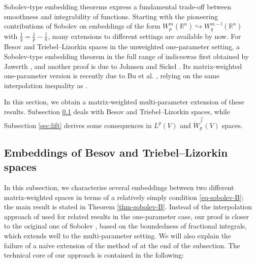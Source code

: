 \documentclass[11pt, reqno]{amsart}
\theoremstyle{definition}
\theoremstyle{remark}
\numberwithin{equation}{section}
\newcommand{\R}{\mathbb R}
\begin{document}
Sobolev-type embedding theorems express a fundamental trade-off between smoothness and integrability of functions. Starting with the pioneering contributions of Sobolev \cite{Sobolev} on embeddings of the form $W^{m}_p(\R^n)\hookrightarrow W^{m-l}_q(\R^n)$ with $\frac1q=\frac1p-\frac{l}{n}$, many extensions to different settings are available by now. For Besov and Triebel--Lizorkin spaces in the unweighted one-parameter setting, a Sobolev-type embedding theorem in the full range of indiceswas first obtained by Jawerth \cite{Jawerth}, and another proof is due to Johnsen and Sickel \cite{JS07}. Its matrix-weighted one-parameter version is recently due to Bu et al. \cite{BYYZ1}, relying on the same interpolation inequality as \cite{JS07}.

In this section, we obtain a matrix-weighted multi-parameter extension of these results.
Subsection \ref{sec:embBTL} deals with Besov and Triebel--Lizorkin spaces, while Subsection \ref{sec:lift} derives some consequences in $L^p(V)$ and $\dot W^{\vec l}_p(V)$ spaces.

\subsection{Embeddings of Besov and Triebel--Lizorkin spaces}\label{sec:embBTL}
In this subsection, we characterise several embeddings between two different matrix-weighted spaces in terms of a relatively simply condition \eqref{eq-sobolev-B}; the main result is stated in Theorem \ref{thm-sobolev-B}.
Instead of the interpolation approach of \cite{BYYZ1,JS07} used for related results in the one-parameter case, our proof is closer to the original one of Sobolev \cite{Sobolev}, based on the boundedness of fractional integrals, which extends well to the multi-parameter setting. We will also explain the failure of a na\"ive extension of the method of \cite{BYYZ1,JS07} at the end of the subsection. The technical core of our approach is contained in the following:
\end{document}

